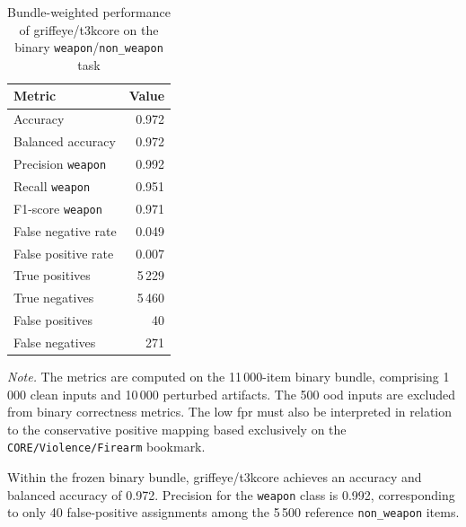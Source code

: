 \begin{table}[H]
\centering
\caption{Bundle-weighted performance of
\gls{griffeye}/\gls{t3kcore} on the binary
\texttt{weapon}/\texttt{non\_weapon} task}
\label{tab:results-griffeye-global-metrics}
\small
\begin{tabular}{@{}l r@{}}
\toprule
\textbf{Metric} &
\textbf{Value} \\
\midrule

Accuracy
& 0.972 \\

Balanced accuracy
& 0.972 \\

Precision \texttt{weapon}
& 0.992 \\

Recall \texttt{weapon}
& 0.951 \\

F1-score \texttt{weapon}
& 0.971 \\

False negative rate
& 0.049 \\

False positive rate
& 0.007 \\

True positives
& 5\,229 \\

True negatives
& 5\,460 \\

False positives
& 40 \\

False negatives
& 271 \\

\bottomrule
\end{tabular}

\vspace{0.4em}
\footnotesize
\textit{Note.} The metrics are computed on the 11\,000-item binary bundle,
comprising 1\,000 clean inputs and 10\,000 perturbed artifacts. The 500
\gls{ood} inputs are excluded from binary correctness metrics. The low
\acrshort{fpr} must also be interpreted in relation to the conservative
positive mapping based exclusively on the
\texttt{CORE/Violence/Firearm} bookmark.
\end{table}

Within the frozen binary bundle, \gls{griffeye}/\gls{t3kcore} achieves an
accuracy and balanced accuracy of 0.972. Precision for the
\texttt{weapon} class is 0.992, corresponding to only 40 false-positive
assignments among the 5\,500 reference \texttt{non\_weapon} items.

